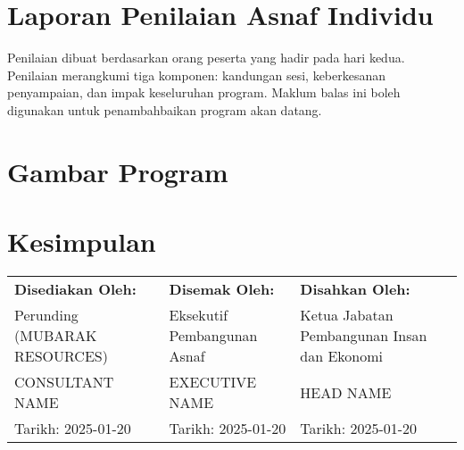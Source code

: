 \documentclass[a4paper,12pt]{article}
\begin{document}
\section{Laporan Penilaian Asnaf Individu}
Penilaian dibuat berdasarkan  orang peserta yang hadir pada hari kedua. Penilaian merangkumi tiga komponen: kandungan sesi, keberkesanan penyampaian, dan impak keseluruhan program. Maklum balas ini boleh digunakan untuk penambahbaikan program akan datang.

\section{Gambar Program}
\begin{figure}[h]
    \centering
    
\end{figure}

\section{Kesimpulan}


\begin{center}
    \vspace{1cm}
    \begin{tabular}{p{5cm}p{5cm}p{5cm}}
        \textbf{Disediakan Oleh:} & \textbf{Disemak Oleh:} & \textbf{Disahkan Oleh:} \\
        Perunding (MUBARAK RESOURCES) & Eksekutif Pembangunan Asnaf & Ketua Jabatan Pembangunan Insan dan Ekonomi \\
        CONSULTANT NAME & EXECUTIVE NAME & HEAD NAME \\
        Tarikh: 2025-01-20 & Tarikh: 2025-01-20 & Tarikh: 2025-01-20 \\
    \end{tabular}
\end{center}
\end{document}

